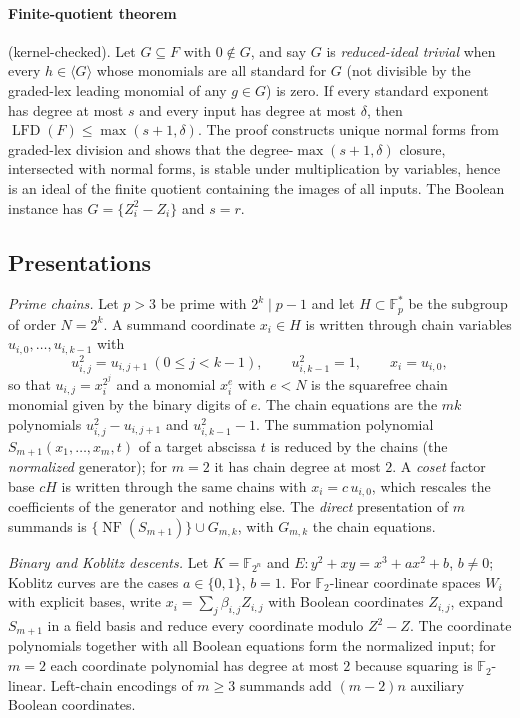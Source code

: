 \documentclass[11pt]{article}
\theoremstyle{definition}\newtheorem{definition}[theorem]{Definition}
\theoremstyle{remark}\newtheorem{remark}[theorem]{Remark}
\newcommand{\F}{\mathbb F}
\newcommand{\lfd}{\operatorname{LFD}}
\newcommand{\NF}{\operatorname{NF}}
\begin{document}
\paragraph{Finite-quotient theorem} (kernel-checked).
Let $G\subseteq F$ with $0\notin G$, and say $G$ is \emph{reduced-ideal
trivial} when every $h\in\langle G\rangle$ whose monomials are all standard
for $G$ (not divisible by the graded-lex leading monomial of any $g\in G$)
is zero. If every standard exponent has degree at most $s$ and every input
has degree at most $\delta$, then $\lfd(F)\le\max(s+1,\delta)$. The proof
constructs unique normal forms from graded-lex division and shows that the
degree-$\max(s+1,\delta)$ closure, intersected with normal forms, is stable
under multiplication by variables, hence is an ideal of the finite quotient
containing the images of all inputs. The Boolean instance has
$G=\{Z_i^2-Z_i\}$ and $s=r$.

\subsection{Presentations}\label{sec:presentations}
\emph{Prime chains.} Let $p>3$ be prime with $2^k\mid p-1$ and let
$H\subset\F_p^*$ be the subgroup of order $N=2^k$. A summand coordinate
$x_i\in H$ is written through chain variables $u_{i,0},\ldots,u_{i,k-1}$
with
\[
 u_{i,j}^2=u_{i,j+1}\ (0\le j<k-1),\qquad u_{i,k-1}^2=1,\qquad x_i=u_{i,0},
\]
so that $u_{i,j}=x_i^{2^j}$ and a monomial $x_i^e$ with $e<N$ is the
squarefree chain monomial given by the binary digits of $e$. The chain
equations are the $mk$ polynomials $u_{i,j}^2-u_{i,j+1}$ and
$u_{i,k-1}^2-1$. The summation polynomial $S_{m+1}(x_1,\ldots,x_m,t)$ of a
target abscissa $t$ is reduced by the chains (the \emph{normalized}
generator); for $m=2$ it has chain degree at most $2$. A \emph{coset}
factor base $cH$ is written through the same chains with $x_i=c\,u_{i,0}$,
which rescales the coefficients of the generator and nothing else. The
\emph{direct} presentation of $m$ summands is $\{\NF(S_{m+1})\}\cup G_{m,k}$,
with $G_{m,k}$ the chain equations.

\emph{Binary and Koblitz descents.} Let $K=\F_{2^n}$ and
$E:y^2+xy=x^3+ax^2+b$, $b\ne0$; Koblitz curves are the cases $a\in\{0,1\}$,
$b=1$. For $\F_2$-linear coordinate spaces $W_i$ with explicit bases, write
$x_i=\sum_j\beta_{i,j}Z_{i,j}$ with Boolean coordinates $Z_{i,j}$, expand
$S_{m+1}$ in a field basis and reduce every coordinate modulo $Z^2-Z$. The
coordinate polynomials together with all Boolean equations form the
normalized input; for $m=2$ each coordinate polynomial has degree at most
$2$ because squaring is $\F_2$-linear. Left-chain encodings of $m\ge3$
summands add $(m-2)n$ auxiliary Boolean coordinates.
\end{document}
